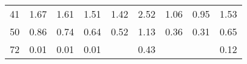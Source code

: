 \begin{table}[]
\begin{center}
\begin{tabular}{crrrrrrrr}
41    & 1.67                     & 1.61                     & 1.51                     & 1.42                     & 2.52                     & 1.06                     & 0.95                     & 1.53                        \\
50    & 0.86                     & 0.74                     & 0.64                     & 0.52                     & 1.13                     & 0.36                     & 0.31                     & 0.65                        \\
72    & 0.01                     & 0.01                     & 0.01                     &                          & 0.43                     &                          &                          & 0.12                        \\ \hline
\end{tabular}
\end{center}
\end{table}